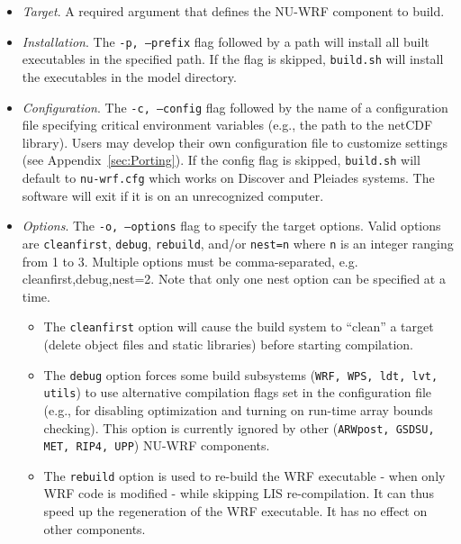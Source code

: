 \begin{itemize}

 \item \textit{Target}. A required argument that defines the NU-WRF component to build.

 \item \textit{Installation}. The \texttt{-p, --prefix} flag followed by a path 
    will install all built executables in the specified path. If the flag is skipped,
    \texttt{build.sh} will install the executables in the model directory.

 \item \textit{Configuration}. The \texttt{-c, --config} flag followed by the name
  of a configuration file specifying critical environment variables (e.g., the
  path to the netCDF library). Users may develop their own configuration 
  file to customize settings (see Appendix~\ref{sec:Porting}). If the 
  config flag is skipped, \texttt{build.sh} will default to 
   \texttt{nu-wrf.cfg} which works on Discover and Pleiades systems.
   The software will exit if it is on an unrecognized computer. 

\item \textit{Options}. The \texttt{-o, --options} flag to specify the target options. 
Valid options are \texttt{cleanfirst}, 
  \texttt{debug}, \texttt{rebuild}, and/or \texttt{nest=n} where \texttt{n} is an integer 
  ranging from 1 to 3. Multiple options must be comma-separated,
   e.g. cleanfirst,debug,nest=2. Note that only one nest option can be specified at a time.
   
  \begin{itemize} 
  
    \item The \texttt{cleanfirst} option will cause the build system to
      ``clean'' a target (delete object files and static libraries) before 
      starting compilation. 

    \item The \texttt{debug} option forces some build subsystems 
    (\texttt{WRF, WPS, ldt, lvt, utils}) to use alternative compilation flags set 
      in the configuration file (e.g., for disabling optimization and turning 
      on run-time array bounds checking). This option is currently ignored by 
      other (\texttt{ARWpost, GSDSU, MET, RIP4, UPP})  NU-WRF components.

    \item The \texttt{rebuild} option is used to re-build the WRF executable - when only 
    WRF code is modified - while skipping LIS re-compilation. It can thus speed up the 
    regeneration of the WRF executable. It has no effect on other components.
               

\end{itemize}
\end{itemize}
